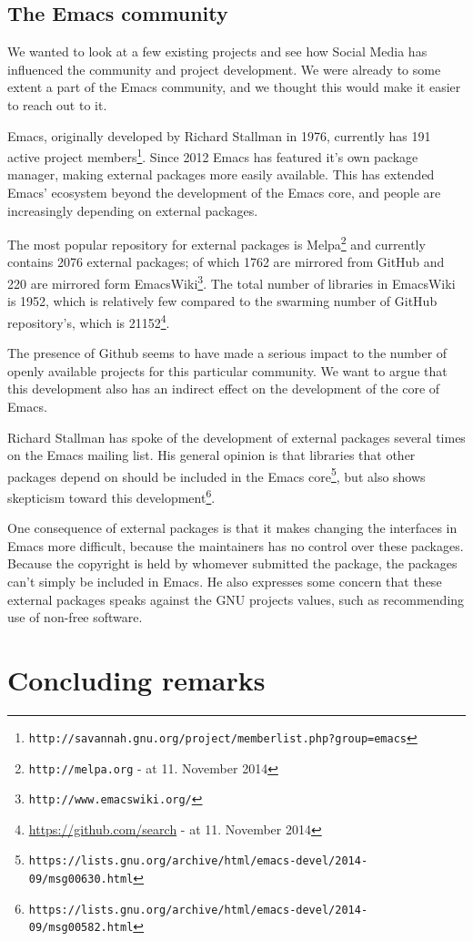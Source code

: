 \documentclass[a4paper,11pt]{article} %
\begin{document}
\subsection{The Emacs community}

We wanted to look at a few existing projects and see how Social Media has
influenced the community and project development. We were already to some
extent a part of the Emacs community, and we thought this would make it
easier to reach out to it.

Emacs, originally developed by Richard Stallman in 1976, currently has
\num{191} active project
members\footnote{\texttt{http://savannah.gnu.org/project/memberlist.php?group=emacs}}.
Since \num{2012} Emacs has featured it's own package manager, making
external packages more easily available. This has extended Emacs' ecosystem
beyond the development of the Emacs core, and people are increasingly
depending on external packages.

The most popular repository for external packages is
Melpa\footnote{\texttt{http://melpa.org} - at 11. November 2014} and
currently contains \num{2076} external packages; of which \num{1762} are
mirrored from GitHub and \num{220} are mirrored form
EmacsWiki\footnote{\texttt{http://www.emacswiki.org/}}. The total number of
libraries in EmacsWiki is \num{1952}, which is relatively few compared to
the swarming number of GitHub repository's, which is
\num{21152}\footnote{\href{https://github.com/search?utf8=\%E2\%9C\%93\&q=language\%3Aemacs-lisp\&type=Repositories\&ref=searchresults}{https://github.com/search} - at 11. November 2014}.

The presence of Github seems to have made a serious impact to the number of
openly available projects for this particular community. We want to argue
that this development also has an indirect effect on the development of the
core of Emacs.

Richard Stallman has spoke of the development of external packages several
times on the Emacs mailing list. His general opinion is that libraries that
other packages depend on should be included in the Emacs
core\footnote{\texttt{https://lists.gnu.org/archive/html/emacs-devel/2014-09/msg00630.html}},
but also shows skepticism toward this
development\footnote{\texttt{https://lists.gnu.org/archive/html/emacs-devel/2014-09/msg00582.html}}.

One consequence of external packages is that it makes changing the
interfaces in Emacs more difficult, because the maintainers has no control
over these packages. Because the copyright is held by whomever submitted the
package, the packages can't simply be included in Emacs. He also expresses
some concern that these external packages speaks against the GNU projects
values, such as recommending use of non-free software.

\section{Concluding remarks}

\printbibliography
\end{document}

